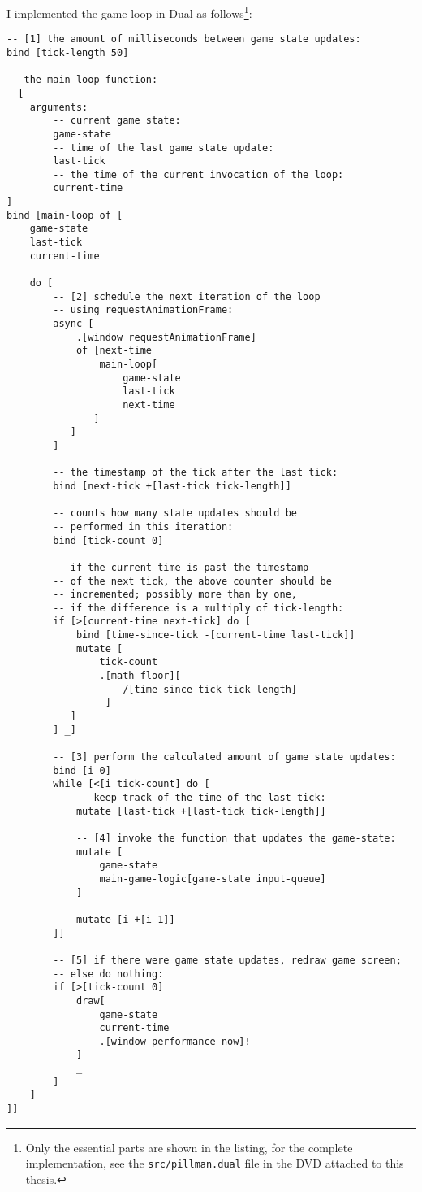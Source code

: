 I implemented the game loop in Dual as follows\footnote{Only the essential parts are shown in the listing, for the complete implementation, see the \texttt{src/pillman.dual} file in the DVD attached to this thesis.}:
\begin{lstlisting}
-- [1] the amount of milliseconds between game state updates:
bind [tick-length 50]

-- the main loop function:
--[
    arguments:
        -- current game state:
        game-state 
        -- time of the last game state update:
        last-tick
        -- the time of the current invocation of the loop:
        current-time
]
bind [main-loop of [
    game-state
    last-tick
    current-time
    
    do [ 
        -- [2] schedule the next iteration of the loop
        -- using requestAnimationFrame:
        async [
            .[window requestAnimationFrame] 
            of [next-time
                main-loop[
                    game-state
                    last-tick
                    next-time
               ]
           ]
        ]
        
        -- the timestamp of the tick after the last tick:
        bind [next-tick +[last-tick tick-length]]
        
        -- counts how many state updates should be
        -- performed in this iteration:
        bind [tick-count 0]
        
        -- if the current time is past the timestamp 
        -- of the next tick, the above counter should be
        -- incremented; possibly more than by one,
        -- if the difference is a multiply of tick-length:
        if [>[current-time next-tick] do [
            bind [time-since-tick -[current-time last-tick]]
            mutate [
                tick-count
                .[math floor][
                    /[time-since-tick tick-length]
                 ]
           ]
        ] _]
        
        -- [3] perform the calculated amount of game state updates:
        bind [i 0]
        while [<[i tick-count] do [
            -- keep track of the time of the last tick:
            mutate [last-tick +[last-tick tick-length]]
        
            -- [4] invoke the function that updates the game-state:
            mutate [
                game-state
                main-game-logic[game-state input-queue]
            ]
            
            mutate [i +[i 1]]
        ]]
        
        -- [5] if there were game state updates, redraw game screen;
        -- else do nothing:
        if [>[tick-count 0]
            draw[
                game-state
                current-time
                .[window performance now]!
            ]
            _
        ]
    ]
]]
\end{lstlisting}

